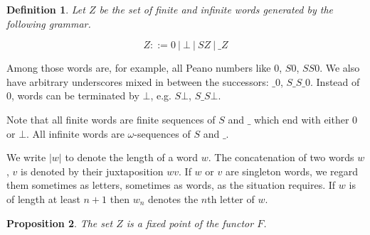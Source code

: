 \documentclass[a4paper]{article}
\newtheorem{defNuF}{Definition}[section]
\newtheorem{thmDomNuFisFixedPoint}[defNuF]{Proposition}
\begin{document}
\begin{defNuF}

Let $Z$ be the set of finite and infinite words generated by the following
grammar.

\begin{equation*}
Z ::= 0 \ |\ \bot \ |\ S Z \ |\ \_ Z
\end{equation*}

\end{defNuF}

Among those words are, for example, all Peano numbers like $0$, $S0$, $SS0$.
We also have arbitrary underscores mixed in between the successors: $\_0$,
$S\_S\_0$.  Instead of $0$, words can be terminated by $\bot$, e.g.  $S\bot$,
$S\_S\bot$.

Note that all finite words are finite sequences of $S$ and $\_$ which end with
either $0$ or $\bot$. All infinite words are $\omega$-sequences of $S$ and $\_$.

We write $|w|$ to denote the length of a word $w$.  The concatenation of two
words $w$, $v$ is denoted by their juxtaposition $wv$.  If $w$ or $v$ are
singleton words, we regard them sometimes as letters, sometimes as words, as the
situation requires.  If $w$ is of length at least $n+1$ then $w_n$ denotes the
$n$th letter of $w$.

\begin{thmDomNuFisFixedPoint}

The set $Z$ is a fixed point of the functor $F$.

\end{thmDomNuFisFixedPoint}
\end{document}
